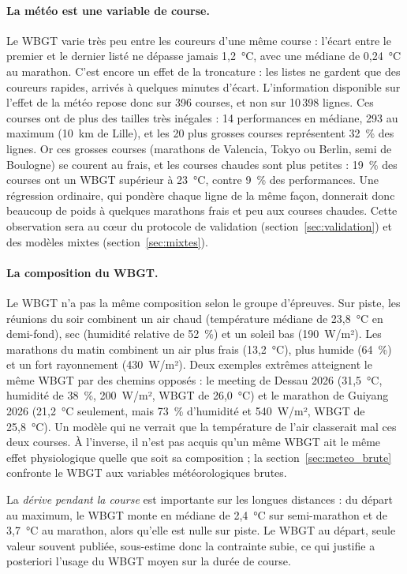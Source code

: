 \documentclass[11pt,a4paper]{article}
\begin{document}
\paragraph{La météo est une variable de course.} Le WBGT varie très peu entre les coureurs d'une même course : l'écart
entre le premier et le dernier listé ne dépasse jamais 1,2~°C, avec une médiane de 0,24~°C au marathon. C'est encore
un effet de la troncature : les listes ne gardent que des coureurs rapides, arrivés à quelques minutes d'écart.
L'information disponible sur l'effet de la météo repose donc sur 396 courses, et non sur 10\,398 lignes. Ces courses
ont de plus des tailles très inégales : 14 performances en médiane, 293 au maximum (10~km de Lille), et les 20 plus
grosses courses représentent 32~\% des lignes. Or ces grosses courses (marathons de Valencia, Tokyo ou Berlin, semi de
Boulogne) se courent au frais, et les courses chaudes sont plus petites : 19~\% des courses ont un WBGT supérieur à
23~°C, contre 9~\% des performances. Une régression ordinaire, qui pondère chaque ligne de la même façon, donnerait
donc beaucoup de poids à quelques marathons frais et peu aux courses chaudes. Cette observation sera au cœur du
protocole de validation (section~\ref{sec:validation}) et des modèles mixtes (section~\ref{sec:mixtes}).

\paragraph{La composition du WBGT.} Le WBGT n'a pas la même composition selon le groupe d'épreuves. Sur piste, les
réunions du soir combinent un air chaud (température médiane de 23,8~°C en demi-fond), sec (humidité relative de
52~\%) et un soleil bas (190~W/m²). Les marathons du matin combinent un air plus frais (13,2~°C), plus humide (64~\%)
et un fort rayonnement (430~W/m²). Deux exemples extrêmes atteignent le même WBGT par des chemins opposés : le meeting
de Dessau 2026 (31,5~°C, humidité de 38~\%, 200~W/m², WBGT de 26,0~°C) et le marathon de Guiyang 2026 (21,2~°C
seulement, mais 73~\% d'humidité et 540~W/m², WBGT de 25,8~°C). Un modèle qui ne verrait que la température de l'air
classerait mal ces deux courses. À l'inverse, il n'est pas acquis qu'un même WBGT ait le même effet physiologique
quelle que soit sa composition ; la section~\ref{sec:meteo_brute} confronte le WBGT aux variables météorologiques
brutes.

La \emph{dérive pendant la course} est importante sur les longues distances : du départ au maximum, le WBGT monte en
médiane de 2,4~°C sur semi-marathon et de 3,7~°C au marathon, alors qu'elle est nulle sur piste. Le WBGT au départ,
seule valeur souvent publiée, sous-estime donc la contrainte subie, ce qui justifie a posteriori l'usage du WBGT moyen
sur la durée de course.
\end{document}
